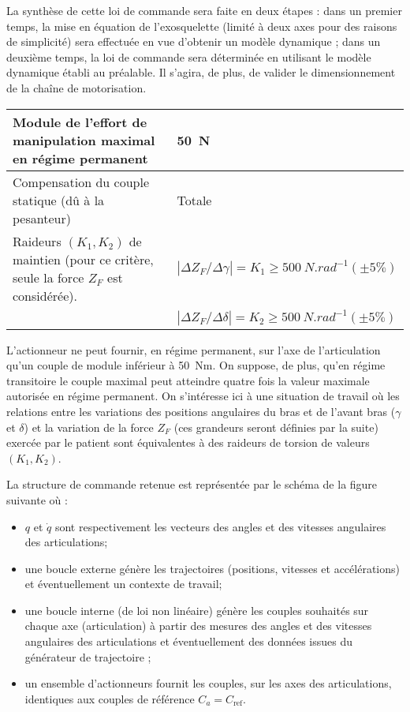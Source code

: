 La synthèse de cette loi de commande sera faite en
deux étapes : dans un premier temps, la mise en équation de l’exosquelette (limité à deux axes pour des
raisons de simplicité) sera effectuée en vue d’obtenir un modèle dynamique ; dans un deuxième temps,
la loi de commande sera déterminée en utilisant le modèle dynamique établi au préalable. Il s’agira, de
plus, de valider le dimensionnement de la chaîne de motorisation.

\footnotesize
\begin{center}
\begin{tabular}{|p{.45\linewidth}|p{.45\linewidth}|}
\hline 
Module de l'effort de manipulation maximal en régime permanent & \SI{50}{N} \\ \hline 
Compensation du couple statique (dû à la pesanteur) & Totale \\ \hline 
Raideurs $(K_1,K_2)$ de maintien (pour ce critère, seule la force $Z_F$ est
considérée). & $|\Delta Z_F/\Delta \gamma|=K_1\geq \SI{500}{N.rad^{-1}} (\pm 5\%)$ \\
& $|\Delta Z_F/\Delta \delta|=K_2\geq \SI{500}{N.rad^{-1}} (\pm 5\%)$ \\\hline 
\end{tabular}
\end{center}

\normalsize

L’actionneur ne peut fournir, en régime permanent, sur l’axe de l’articulation qu’un
couple de module inférieur à \SI{50}{Nm}. On suppose, de plus, qu’en régime transitoire le couple maximal peut
atteindre quatre fois la valeur maximale autorisée en régime permanent.
On s’intéresse ici à une situation de travail où les relations entre les variations des positions angulaires du
bras et de l’avant bras ($\gamma$ et $\delta$) et la variation de la force $Z_F$ (ces grandeurs seront définies par la suite) exercée par le patient sont équivalentes à des raideurs de torsion de valeurs $(K_1,K_2)$.

La structure de commande retenue est représentée par le schéma de la figure suivante où :
\begin{itemize}
\item $q$ et $\dot{q}$ sont respectivement les vecteurs des angles et des vitesses angulaires des articulations;
\item une boucle externe génère les trajectoires (positions, vitesses et accélérations) et éventuellement un contexte
de travail;
\item une boucle interne (de loi non linéaire) génère les couples souhaités sur chaque axe (articulation) à partir
des mesures des angles et des vitesses angulaires des articulations et éventuellement des données issues du
générateur de trajectoire ;
\item un ensemble d’actionneurs fournit les couples, sur les axes des articulations, identiques aux couples de
référence $C_a = C_{\text{ref}}$.
\end{itemize}

